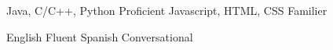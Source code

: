 \begin{cvhonors}
  \cvhonor
    {Java, C/C++, Python}
    {}
    {}
    {Proficient}
  \cvhonor
    {Javascript, HTML, CSS}
    {}
    {}
    {Familier}
\end{cvhonors}

\begin{cvhonors}
  \cvhonor
    {English}
    {}
    {}
    {Fluent}
  \cvhonor
    {Spanish}
    {}
    {}
    {Conversational}

\end{cvhonors}
